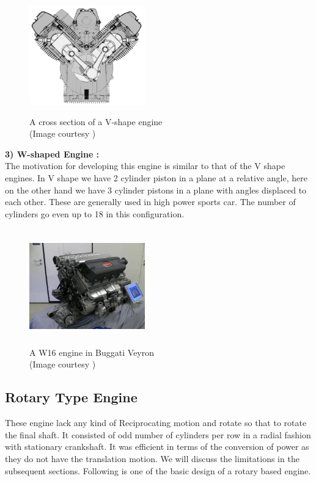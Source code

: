 \documentclass[11pt]{article}
\begin{document}
\begin{center}
        \begin{figure}[!h]
        \centering
          \includegraphics[width=50mm, height=50mm]{V_shape.PNG}
          \caption{A cross section of a V-shape engine\\ (Image courtesy \cite{ref10})
          }
          \label{fig:Piston}
        \end{figure}
\end{center}
\begin{flushleft}
\pagebreak
\textbf{3) W-shaped Engine : \\}
The motivation for developing this engine is similar to that of the V shape engines. In V shape we have 2 cylinder piston in a plane at a relative angle, here on the other hand we have 3 cylinder pistons in a plane with angles displaced to each other. These are generally used in high power sports car. The number of cylinders go even up to 18 in this configuration. 
\end{flushleft}

        \begin{figure}[!h]
        \centering
          \includegraphics[width=50mm, height=50mm]{W_shape.PNG}
          \caption{A W16 engine in Buggati Veyron\\ (Image courtesy \cite{ref12})
          }
          \label{fig:Piston}
        \end{figure}

\subsection{Rotary Type Engine}
These engine lack any kind of Reciprocating motion and rotate so that to rotate the final shaft. It consisted of odd number of cylinders per row in a radial fashion with stationary crankshaft. It was efficient in terms of the conversion of power as they do not have the translation motion. We will discuss the limitations in the subsequent sections. Following is one of the basic design of a rotary based engine.\\
\end{document}
